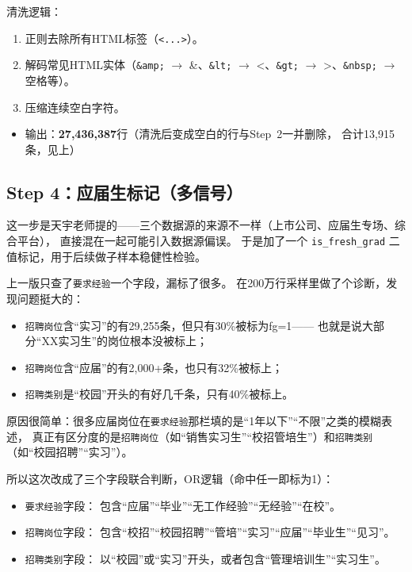 \documentclass[12pt,a4paper]{ctexart}
\begin{document}
清洗逻辑：
\begin{enumerate}
\item 正则去除所有HTML标签（\texttt{<...>}）。
\item 解码常见HTML实体（\texttt{\&amp;} $\to$ \&、\texttt{\&lt;} $\to$ <、\texttt{\&gt;} $\to$ >、\texttt{\&nbsp;} $\to$ 空格等）。
\item 压缩连续空白字符。
\end{enumerate}

\begin{itemize}
\item 输出：\textbf{27,436,387}行（清洗后变成空白的行与Step~2一并删除，
合计13,915条，见上）
\end{itemize}


\subsection{Step 4：应届生标记（多信号）}

这一步是天宇老师提的——三个数据源的来源不一样（上市公司、应届生专场、综合平台），
直接混在一起可能引入数据源偏误。
于是加了一个 \texttt{is\_fresh\_grad} 二值标记，用于后续做子样本稳健性检验。

上一版只查了\texttt{要求经验}一个字段，漏标了很多。
在200万行采样里做了个诊断，发现问题挺大的：

\begin{itemize}
\item \texttt{招聘岗位}含``实习''的有29,255条，但只有30\%被标为fg=1——
也就是说大部分``XX实习生''的岗位根本没被标上；
\item \texttt{招聘岗位}含``应届''的有2,000+条，也只有32\%被标上；
\item \texttt{招聘类别}是``校园''开头的有好几千条，只有40\%被标上。
\end{itemize}

原因很简单：很多应届岗位在\texttt{要求经验}那栏填的是``1年以下''``不限''之类的模糊表述，
真正有区分度的是\texttt{招聘岗位}（如``销售实习生''``校招管培生''）和\texttt{招聘类别}（如``校园招聘''``实习''）。

所以这次改成了三个字段联合判断，OR逻辑（命中任一即标为1）：

\begin{itemize}
\item \texttt{要求经验}字段：
包含``应届''``毕业''``无工作经验''``无经验''``在校''。

\item \texttt{招聘岗位}字段：
包含``校招''``校园招聘''``管培''``实习''``应届''``毕业生''``见习''。

\item \texttt{招聘类别}字段：
以``校园''或``实习''开头，或者包含``管理培训生''``实习生''。
\end{itemize}
\end{document}
